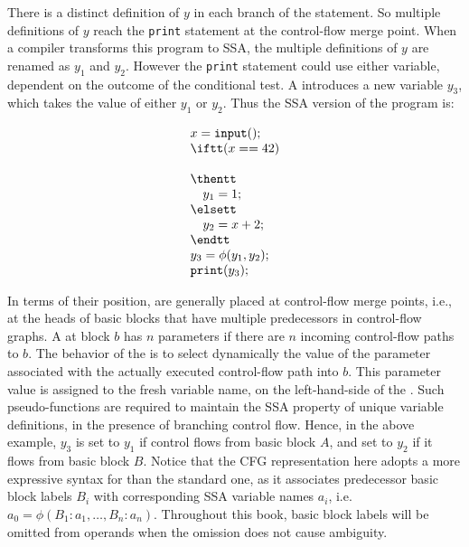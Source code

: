 There is a distinct definition of $y$ in each branch of the \iftt
statement. So multiple definitions of $y$ reach the \texttt{print} statement
at the control-flow merge point. When a compiler transforms this program 
to SSA,
the multiple definitions of $y$ are renamed as $y_1$ and $y_2$. However 
the \texttt{print} statement could use either variable, dependent on the
outcome of the \iftt conditional test. A \phifun introduces
a new variable $y_3$, which takes the value of either $y_1$ or $y_2$.
Thus the SSA version of the program is:
\smallskip

\begin{minipage}{0.4\textwidth}
\begin{equation*}
\begin{array}{l}
x = \texttt{input}();\\
\iftt (x == 42)\\
\\
\thentt\\
\quad    y_1 = 1;\\
\elsett\\
\quad    y_2 = x + 2;\\
\endtt\\
y_3 = \phi(y_1,y_2);\\
\texttt{print}(y_3);\\
\end{array}
\end{equation*}
\end{minipage}
\begin{minipage}{0.4\textwidth}
\strut
\end{minipage}
\bigskip


In terms of their position, 
\phifuns{} are generally placed at control-flow merge points,
i.e., at the heads of basic blocks that have multiple predecessors in
control-flow graphs.
A \phifun at block $b$ has
$n$ parameters if there are $n$ incoming control-flow paths to $b$.
The behavior of the \phifun is to select dynamically
the value of the parameter associated with the actually executed
control-flow path into $b$.
This parameter value is assigned to the fresh variable name,
on the left-hand-side of the \phifun.
Such pseudo-functions are required to maintain the SSA property
of unique variable definitions,
in the presence of branching control flow.
Hence, in the above example, $y_3$ is set to $y_1$ if 
control flows from basic block $A$, and set to $y_2$ if it flows from
basic block $B$.
Notice that the CFG representation here adopts a more expressive syntax for
\phifuns than the standard one, as it associates predecessor basic block labels $B_i$
with corresponding SSA variable names $a_i$, i.e.\
$a_0 = \phi(B_1:a_1, \ldots, B_n:a_n)$.
Throughout this book, basic block labels will be omitted from \phifun
operands when the omission does not cause ambiguity.

